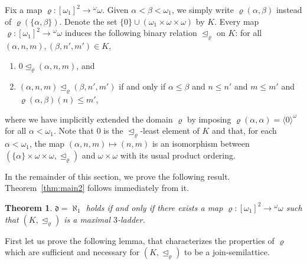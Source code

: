 \documentclass[]{amsart}
\newtheorem{theorem}{Theorem}[section]
\theoremstyle{definition}
\theoremstyle{remark}
\begin{document}
Fix a map $\varrho: [\omega_1]^2 \rightarrow {}^\omega \omega$. Given $\alpha < \beta < \omega_1$, we simply write $\varrho(\alpha, \beta)$ instead of $\varrho(\{\alpha, \beta\})$. Denote the set $\{0\} \cup (\omega_1 \times \omega \times \omega)$ by $K$.  Every map $\varrho: [\omega_1]^2 \rightarrow {}^\omega \omega$ induces the following binary relation $\trianglelefteq_\varrho$ on $K$: for all $(\alpha, n, m), (\beta, n',m') \in K$,
\begin{enumerate}
\item $0 \trianglelefteq_\varrho (\alpha, n, m)$, and
\item $(\alpha, n, m) \trianglelefteq_\varrho (\beta, n',m')$ if and only if $\alpha \le \beta$  and $n \le n'$ and $m \le m'$ and $\varrho(\alpha, \beta)(n) \le m'$,
\end{enumerate}
where we have implicitly extended the domain $\varrho$ by imposing $\varrho(\alpha, \alpha) = \langle 0\rangle^\omega$ for all $\alpha < \omega_1$. Note that $0$ is the $\trianglelefteq_\varrho$-least element of $K$ and that, for each $\alpha < \omega_1$, the map $(\alpha, n, m) \mapsto (n,m)$ is an isomorphism between  $(\{\alpha\} \times \omega \times \omega, \trianglelefteq_\varrho)$ and  $\omega \times \omega$ with its usual product ordering.

In the remainder of this section, we prove the following result. Theorem~\ref{thm:main2} follows immediately from it.
\begin{theorem}\label{thm:dominatingmain}
$\mathfrak{d} = \aleph_1$ holds if and only if there exists a map $\varrho:[\omega_1]^2 \rightarrow {}^\omega \omega$ such that $(K, \trianglelefteq_\varrho)$ is a maximal $3$-ladder.
\end{theorem}

First let us prove the following lemma, that characterizes the properties of $\varrho$ which are sufficient and necessary for $(K, \trianglelefteq_\varrho)$ to be a join-semilattice.
\end{document}
